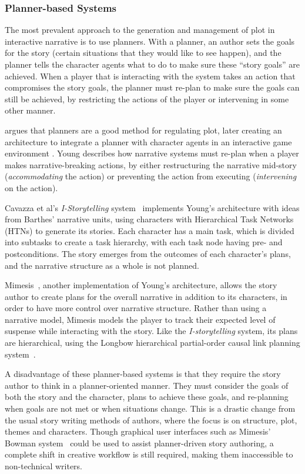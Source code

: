 \subsubsection{Planner-based Systems}
The most prevalent approach to the generation and management of plot in
interactive narrative is to use planners. With a planner, an author sets the
goals for the story (certain situations that they would like to see happen), and
the planner tells the character agents what to do to make sure these ``story
goals'' are achieved. When a player that is interacting with the system takes an
action that compromises the story goals, the planner must re-plan to make sure
the goals can still be achieved, by restricting the actions of the player or
intervening in some other manner.

\citep{young1999notes} argues that planners are a good method for regulating plot, later creating an architecture to integrate a planner with character agents in an interactive game environment \cite{young2004architecture}. Young describes how narrative systems must re-plan when a player makes  narrative-breaking actions, by either restructuring the narrative mid-story (\emph{accommodating} the action) or preventing the action from executing (\emph{intervening} on the action).

Cavazza et al's \emph{I-Storytelling} system~\cite{cavazza2002character} implements Young's architecture with ideas from Barthes' narrative units, using characters with Hierarchical Task Networks (HTNs) to generate its stories. Each character has a main task, which is divided into subtasks to create a task hierarchy, with each task node having pre- and postconditions. The story emerges from the outcomes of each character's plans, and the narrative structure as a whole is not planned.

Mimesis~\cite{riedl2003managing}, another implementation of Young's architecture, allows the story author to create plans for the overall narrative in addition to its characters, in order to have more control over narrative structure. Rather than using a narrative model, Mimesis models the player to track their expected level of suspense while interacting with the story. Like the \emph{I-storytelling} system, its plans are hierarchical, using the Longbow hierarchical partial-order causal link planning system~\cite{young1994decomposition}.

A disadvantage of these planner-based systems is that they require the story author to think in a planner-oriented manner. They must consider the goals of both the story and the character, plans to achieve these goals, and re-planning when goals are not met or when situations change. This is a drastic change from the usual story writing methods of authors, where the focus is on structure, plot, themes and characters. Though graphical user interfaces such as Mimesis' Bowman system~\cite{thomas2006author} could be used to assist planner-driven story authoring, a complete shift in creative workflow is still required, making them inaccessible to non-technical writers.

